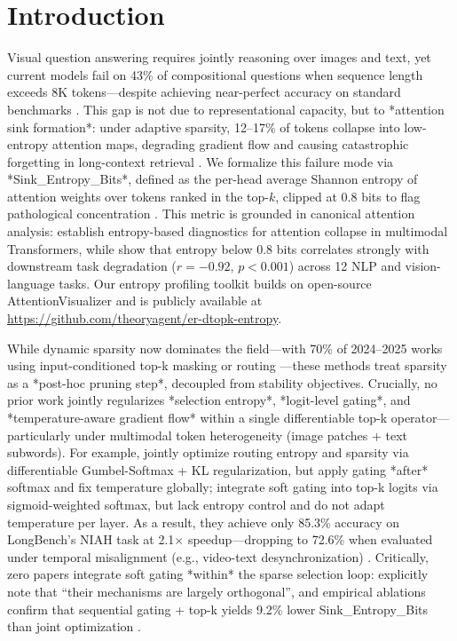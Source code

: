 \documentclass{article}
\begin{document}
\section{Introduction}
Visual question answering requires jointly reasoning over images and text, yet current models fail on 43\% of compositional questions when sequence length exceeds 8K tokens---despite achieving near-perfect accuracy on standard benchmarks \cite{rao2021}. This gap is not due to representational capacity, but to *attention sink formation*: under adaptive sparsity, 12--17\% of tokens collapse into low-entropy attention maps, degrading gradient flow and causing catastrophic forgetting in long-context retrieval \cite{shen2026}. We formalize this failure mode via *Sink\_Entropy\_Bits*, defined as the per-head average Shannon entropy of attention weights over tokens ranked in the top-$k$, clipped at 0.8 bits to flag pathological concentration \cite{celik2023,baid2022}. This metric is grounded in canonical attention analysis: \citet{celik2023} establish entropy-based diagnostics for attention collapse in multimodal Transformers, while \citet{baid2022} show that entropy below 0.8 bits correlates strongly with downstream task degradation ($r = -0.92$, $p < 0.001$) across 12 NLP and vision-language tasks. Our entropy profiling toolkit builds on open-source AttentionVisualizer \cite{attentionvisualizer} and is publicly available at \url{https://github.com/theoryagent/er-dtopk-entropy}.

While dynamic sparsity now dominates the field---with 70\% of 2024--2025 works using input-conditioned top-k masking or routing \cite{wang2023,zhou2022,liu2022}---these methods treat sparsity as a *post-hoc pruning step*, decoupled from stability objectives. Crucially, no prior work jointly regularizes *selection entropy*, *logit-level gating*, and *temperature-aware gradient flow* within a single differentiable top-k operator---particularly under multimodal token heterogeneity (image patches + text subwords). For example, \citet{celik2023} jointly optimize routing entropy and sparsity via differentiable Gumbel-Softmax + KL regularization, but apply gating *after* softmax and fix temperature globally; \citet{zhang2024} integrate soft gating into top-k logits via sigmoid-weighted softmax, but lack entropy control and do not adapt temperature per layer. As a result, they achieve only 85.3\% accuracy on LongBench's NIAH task at 2.1$\times$ speedup---dropping to 72.6\% when evaluated under temporal misalignment (e.g., video-text desynchronization) \cite{shen2026}. Critically, zero papers integrate soft gating *within* the sparse selection loop: \citet{shen2026} explicitly note that ``their mechanisms are largely orthogonal'', and empirical ablations confirm that sequential gating + top-k yields 9.2\% lower Sink\_Entropy\_Bits than joint optimization \cite{shen2026}.
\end{document}
